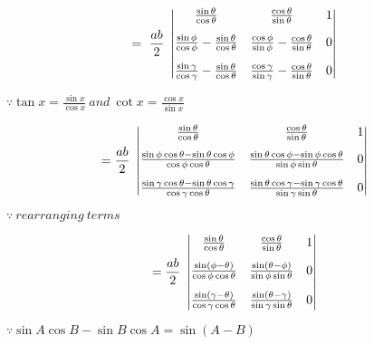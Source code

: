 \documentclass[journal,12pt,twocolumn]{IEEEtran}
\begin{document}
\vspace{0.3cm}
\begin{multline}
=~\frac{ab}{2}~\begin{vmatrix}\vspace{0.3cm}
 \frac{\sin\theta}{\cos\theta} & \frac{\cos\theta}{\sin\theta} & 1  \\ \vspace{0.3cm}
 \frac{\sin\phi}{\cos\phi}-\frac{\sin\theta}{\cos\theta} & \frac{\cos\phi}{\sin\phi}-\frac{\cos\theta}{\sin\theta} & 0  \\
 \frac{\sin\gamma}{\cos\gamma}-\frac{\sin\theta}{\cos\theta} & \frac{\cos\gamma}{\sin\gamma}-\frac{\cos\theta}{\sin\theta} & 0 
\end{vmatrix}\end{multline}
\begin{flushright}
$\because \tan x = \frac{\sin x}{\cos x}~and~\cot x = \frac{\cos x}{\sin x} $
\end{flushright}

\vspace{0.3cm}
\begin{multline}
=\frac{ab}{2}~\begin{vmatrix}\vspace{0.3cm}
 \frac{\sin\theta}{\cos\theta} & \frac{\cos\theta}{\sin\theta} & 1  \\ \vspace{0.3cm}
 \frac{\sin\phi\cos\theta - \sin\theta\cos\phi}{\cos\phi\cos\theta} & \frac{\sin\theta\cos\phi - \sin\phi\cos\theta}{\sin\phi\sin\theta} & 0  \\
  \frac{\sin\gamma\cos\theta - \sin\theta\cos\gamma}{\cos\gamma\cos\theta} & \frac{\sin\theta\cos\gamma - \sin\gamma\cos\theta}{\sin\gamma\sin\theta} & 0
\end{vmatrix}    
\end{multline}
\begin{flushright}
$\because ~rearranging ~terms $
\end{flushright}

\vspace{0.3cm}
\begin{multline}
=\frac{ab}{2}~\begin{vmatrix}\vspace{0.3cm}
 \frac{\sin\theta}{\cos\theta} & \frac{\cos\theta}{\sin\theta} & 1  \\ \vspace{0.3cm}
 \frac{\sin(\phi-\theta)}{\cos\phi\cos\theta} & \frac{\sin(\theta-\phi)}{\sin\phi\sin\theta} & 0  \\
 \frac{\sin(\gamma-\theta)}{\cos\gamma\cos\theta} & \frac{\sin(\theta-\gamma)}{\sin\gamma\sin\theta} & 0 
\end{vmatrix}    
\end{multline}
\begin{flushright}
$\because \sin A\cos B - \sin B\cos A = \sin(A-B)$
\end{flushright}
\end{document}
